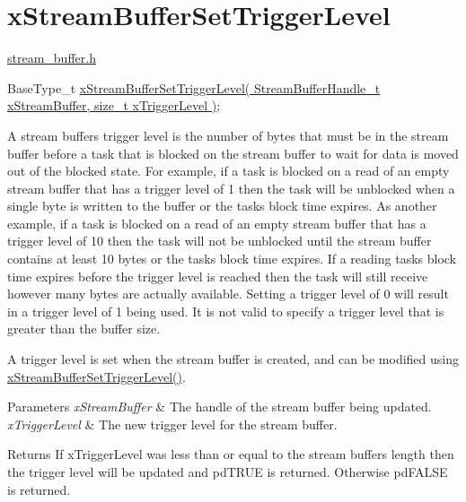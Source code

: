 \hypertarget{group__x_stream_buffer_set_trigger_level}{}\section{x\+Stream\+Buffer\+Set\+Trigger\+Level}
\label{group__x_stream_buffer_set_trigger_level}
\hyperlink{stream__buffer_8h}{stream\+\_\+buffer.\+h}


\begin{DoxyPre}
BaseType\_t \hyperlink{stream__buffer_8h_a28f0280587c76e71efeaa8f415ebde04}{xStreamBufferSetTriggerLevel( StreamBufferHandle\_t xStreamBuffer, size\_t xTriggerLevel )};
\end{DoxyPre}


A stream buffer\textquotesingle{}s trigger level is the number of bytes that must be in the stream buffer before a task that is blocked on the stream buffer to wait for data is moved out of the blocked state. For example, if a task is blocked on a read of an empty stream buffer that has a trigger level of 1 then the task will be unblocked when a single byte is written to the buffer or the task\textquotesingle{}s block time expires. As another example, if a task is blocked on a read of an empty stream buffer that has a trigger level of 10 then the task will not be unblocked until the stream buffer contains at least 10 bytes or the task\textquotesingle{}s block time expires. If a reading task\textquotesingle{}s block time expires before the trigger level is reached then the task will still receive however many bytes are actually available. Setting a trigger level of 0 will result in a trigger level of 1 being used. It is not valid to specify a trigger level that is greater than the buffer size.

A trigger level is set when the stream buffer is created, and can be modified using \hyperlink{stream__buffer_8h_a28f0280587c76e71efeaa8f415ebde04}{x\+Stream\+Buffer\+Set\+Trigger\+Level()}.


\begin{DoxyParams}{Parameters}
{\em x\+Stream\+Buffer} & The handle of the stream buffer being updated.\\
\hline
{\em x\+Trigger\+Level} & The new trigger level for the stream buffer.\\
\hline
\end{DoxyParams}
\begin{DoxyReturn}{Returns}
If x\+Trigger\+Level was less than or equal to the stream buffer\textquotesingle{}s length then the trigger level will be updated and pd\+T\+R\+UE is returned. Otherwise pd\+F\+A\+L\+SE is returned. 
\end{DoxyReturn}
